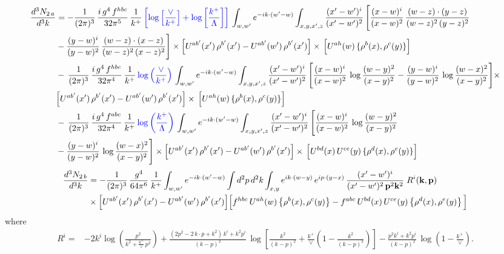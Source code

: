 \documentclass[9pt]{article}
\numberwithin{equation}{section}
\begin{document}
\begin{align}
    \frac{d^{3}N_{2\,a}}{d^{3}k} & = -\frac{1}{(2\pi)^{3}}\,\frac{i\,g^{4}\,f^{hbc}}{32\pi^{5}}\,\frac{1}{k^{+}}\,{\color{blue}\left[\log{\left[\frac{\vee}{k^{+}}\right]}+\log{\left[\frac{k^{+}}{\Lambda}\right]}\right]}\,
\int_{w,w'} e^{-ik\cdot(w'-w)}\int_{x,y,x',z}\frac{(x'-w')^{i}}{(x'-w')^{2}}\,\Bigg[\frac{(x-w)^{i}}{(x-w)^{2}}\, \frac{(w-z)\cdot (y-z)}{(w-z)^{2}\,(y-z)^{2}}\notag \\ & - \frac{(y-w)^{i}}{(y-w)^{2}}\, \frac{(w-z)\cdot (x-z)}{(w-z)^{2}\,(x-z)^{2}}\Bigg]\times\Big[U^{ab'}(x')\,\rho^{b'}(x')-U^{ab'}(w')\,\rho^{b'}(x')\Big]\times\, \Big[U^{ah}(w)\,\{\rho^{b}(x),\rho^{c}(y)\}\Big]\notag \\ & -\,\frac{1}{(2\pi)^{3}}\,\frac{i\,g^{4}\,f^{hbc}}{32\pi^{4}}\,\frac{1}{k^{+}}\,{\color{blue}\log\left(\frac{\vee}{k^{+}}\right)}\,
\int_{w,w'} e^{-ik\cdot(w'-w)}\int_{x,y,x',z}\frac{(x'-w')^{i}}{(x'-w')^{2}}\,\Bigg[\frac{(x-w)^{i}}{(x-w)^{2}}\,\log\frac{(w-y)^{2}}{(x-y)^{2}}-\frac{(y-w)^{i}}{(y-w)^{2}}\,\log\frac{(w-x)^{2}}{(x-y)^{2}}\Bigg]\times\notag \\ & \Big[U^{ab'}(x')\,\rho^{b'}(x')-U^{ab'}(w')\,\rho^{b'}(x')\Big]\times\, \Big[U^{ah}(w)\,\{\rho^{b}(x),\rho^{c}(y)\}\Big]\notag \\ & -\,\frac{1}{(2\pi)^{3}}\,\frac{i\,g^{4}\,f^{abc}}{32\pi^{4}}\,\frac{1}{k^{+}}\,{\color{blue}\log\left(\frac{k^{+}}{\Lambda}\right)}\,
\int_{w,w'} e^{-ik\cdot(w'-w)}\int_{x,y,x',z}\frac{(x'-w')^{i}}{(x'-w')^{2}}\,\Bigg[\frac{(x-w)^{i}}{(x-w)^{2}}\,\log\frac{(w-y)^{2}}{(x-y)^{2}}\notag \\ & -\frac{(y-w)^{i}}{(y-w)^{2}}\,\log\frac{(w-x)^{2}}{(x-y)^{2}}\Bigg]\times \Big[U^{ab'}(x')\,\rho^{b'}(x')-U^{ab'}(w')\,\rho^{b'}(x')\Big]\times\, \Big[U^{bd}(x)\,U^{ce}(y)\,\{\rho^{d}(x),\rho^{e}(y)\}\Big]
\end{align}
\begin{align}
\frac{d^{3}N_{2\,b}}{d^{3}k} & = -\frac{1}{(2\pi)^{3}}\,\frac{g^{4}}{64\pi^{6}}\,\frac{1}{k^{+}}\int_{w,w'} e^{-ik\cdot(w'-w)}
\int d^{2}p\,d^{2}k\int_{x,y} e^{ik\cdot(w-y)}\,e^{ip\cdot(y-x)}\,\frac{(x'-w')^{i}}{(x'-w')^{2}\,\mathbf{p}^{2}\mathbf{k}^{2}}\;R^{i}(\mathbf{k},\mathbf{p})\notag\\
&\times\Big[U^{ab'}(x')\,\rho^{b'}(x')-U^{ab'}(w')\,\rho^{b'}(x')\Big]
\Big[f^{hbc}\,U^{ah}(w)\left\{\rho^{b}(x),\rho^{c}(y)\right\}-f^{abc}\,U^{bd}(x)\,U^{ce}(y)\left\{\rho^{d}(x),\rho^{e}(y)\right\}\Big]
\end{align}
where
\begin{align}
R^{i} =& -2k^{i}\log\left(\frac{p^{2}}{k^{2}+\frac{k^{+}}{\vee}\,p^{2}}\right)
+\frac{(2p^{2}-2\,k\cdot p+k^{2})\,k^{i}+k^{2}p^{i}}{(k-p)^{2}}\,
\log\left[\frac{k^{2}}{(k-p)^{2}}+\frac{k^{+}}{\vee}\left(1-\frac{k^{2}}{(k-p)^{2}}\right)\right]
-\frac{p^{2}k^{i}+k^{2}p^{i}}{(k-p)^{2}}\,\log\left(1-\frac{k^{+}}{\vee}\right).
\end{align}
\end{document}
